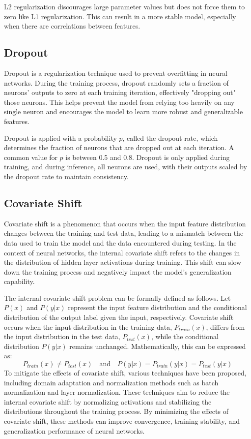 \documentclass[12pt]{article}
\begin{document}
L2 regularization discourages large parameter values but does not force them to zero like L1 regularization. This can result in a more stable model, especially when there are correlations between features.

\subsection{Dropout}

Dropout is a regularization technique used to prevent overfitting in neural networks. During the training process, dropout randomly sets a fraction of neurons' outputs to zero at each training iteration, effectively "dropping out" those neurons. This helps prevent the model from relying too heavily on any single neuron and encourages the model to learn more robust and generalizable features.

Dropout is applied with a probability $p$, called the dropout rate, which determines the fraction of neurons that are dropped out at each iteration. A common value for $p$ is between 0.5 and 0.8. Dropout is only applied during training, and during inference, all neurons are used, with their outputs scaled by the dropout rate to maintain consistency.

\subsection{Covariate Shift}

Covariate shift is a phenomenon that occurs when the input feature distribution changes between the training and test data, leading to a mismatch between the data used to train the model and the data encountered during testing. In the context of neural networks, the internal covariate shift refers to the changes in the distribution of hidden layer activations during training. This shift can slow down the training process and negatively impact the model's generalization capability.

The internal covariate shift problem can be formally defined as follows. Let $P(x)$ and $P(y|x)$ represent the input feature distribution and the conditional distribution of the output label given the input, respectively. Covariate shift occurs when the input distribution in the training data, $P_{train}(x)$, differs from the input distribution in the test data, $P_{test}(x)$, while the conditional distribution $P(y|x)$ remains unchanged. Mathematically, this can be expressed as:
\begin{equation}
P_{train}(x) \neq P_{test}(x) \quad \text{and} \quad P(y|x) = P_{train}(y|x) = P_{test}(y|x)
\end{equation}
To mitigate the effects of covariate shift, various techniques have been proposed, including domain adaptation and normalization methods such as batch normalization and layer normalization. These techniques aim to reduce the internal covariate shift by normalizing activations and stabilizing the distributions throughout the training process. By minimizing the effects of covariate shift, these methods can improve convergence, training stability, and generalization performance of neural networks.
\end{document}
